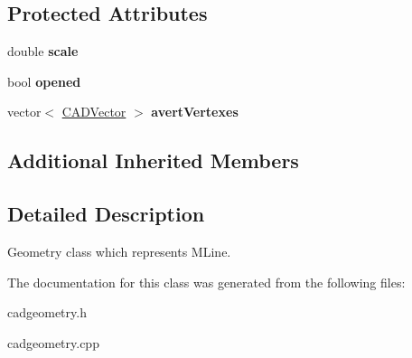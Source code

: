 \subsection*{Protected Attributes}
\begin{DoxyCompactItemize}
\item 
double {\bfseries scale}\hypertarget{class_c_a_d_m_line_a0802919b09267b895399fe886acf3394}{}\label{class_c_a_d_m_line_a0802919b09267b895399fe886acf3394}

\item 
bool {\bfseries opened}\hypertarget{class_c_a_d_m_line_a25a9c1482e4cd6c1471aeca3911c9b37}{}\label{class_c_a_d_m_line_a25a9c1482e4cd6c1471aeca3911c9b37}

\item 
vector$<$ \hyperlink{class_c_a_d_vector}{C\+A\+D\+Vector} $>$ {\bfseries avert\+Vertexes}\hypertarget{class_c_a_d_m_line_acf1be0d3d51d4c63859d4f28ac751df1}{}\label{class_c_a_d_m_line_acf1be0d3d51d4c63859d4f28ac751df1}

\end{DoxyCompactItemize}
\subsection*{Additional Inherited Members}


\subsection{Detailed Description}
Geometry class which represents M\+Line. 

The documentation for this class was generated from the following files\+:\begin{DoxyCompactItemize}
\item 
cadgeometry.\+h\item 
cadgeometry.\+cpp\end{DoxyCompactItemize}
